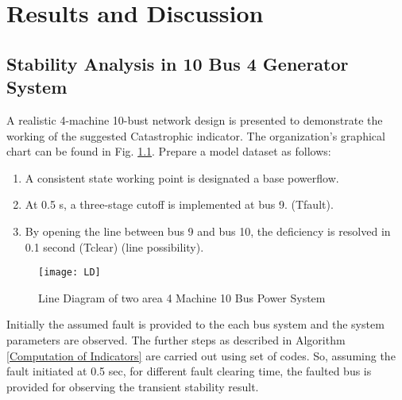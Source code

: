 \chapter{Results and Discussion}
\section{Stability Analysis in 10 Bus 4 Generator System}
\label{contingency1}
A realistic 4-machine 10-bust network design is presented to demonstrate the working of the suggested Catastrophic indicator. The organization's graphical chart can be found in Fig. \ref{fig:Line Diagram}. Prepare a model dataset as follows:
\begin{enumerate}
\item A consistent state working point is designated a base powerflow.
\item At 0.5 s, a three-stage cutoff is implemented at bus 9. (Tfault).
\item By opening the line between bus 9 and bus 10, the deficiency is resolved in 0.1 second (Tclear) (line possibility).

\end{enumerate}

\begin{figure}[H]
  \centering
  \texttt{[image: LD]}
  \caption{Line Diagram of two area 4 Machine 10 Bus Power System}
  \label{fig:Line Diagram}
\end{figure}

Initially the assumed fault is provided to the each bus system and the system parameters are observed. The further steps as described in Algorithm \ref{Computation of Indicators} are carried out using set of codes. So, assuming the fault initiated at 0.5 sec, for different fault clearing time, the faulted bus is provided for observing the transient stability result.

